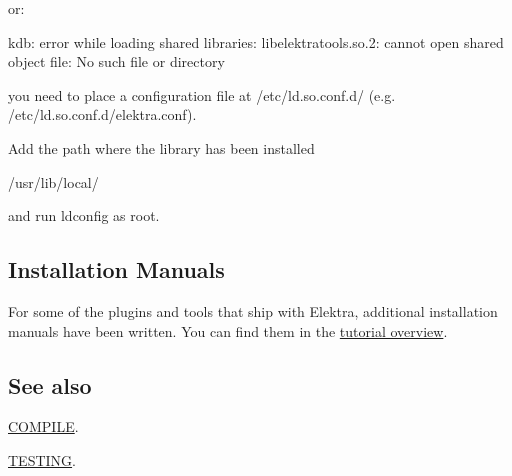 or\+: \begin{DoxyVerb}    kdb: error while loading shared libraries:
         libelektratools.so.2: cannot open shared object file: No such file or directory
\end{DoxyVerb}


you need to place a configuration file at {\ttfamily /etc/ld.so.\+conf.\+d/} (e.\+g. {\ttfamily /etc/ld.so.\+conf.\+d/elektra.conf}).

Add the path where the library has been installed \begin{DoxyVerb}    /usr/lib/local/
\end{DoxyVerb}


and run {\ttfamily ldconfig} as root.

\subsection*{Installation Manuals}

For some of the plugins and tools that ship with Elektra, additional installation manuals have been written. You can find them in the \hyperlink{md_doc_tutorials_README_doc_tutorials_README_md}{tutorial overview}.

\subsection*{See also}


\begin{DoxyItemize}
\item \hyperlink{doc_COMPILE_md}{C\+O\+M\+P\+I\+LE}.
\item \hyperlink{doc_TESTING_md}{T\+E\+S\+T\+I\+NG}. 
\end{DoxyItemize}